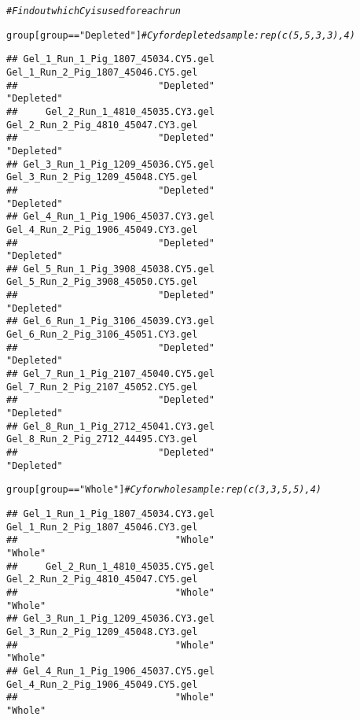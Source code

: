 \documentclass{article}\usepackage[]{graphicx}\usepackage[]{color}
\makeatletter
\newcommand{\hlstr}[1]{\textcolor[rgb]{0.192,0.494,0.8}{#1}}%
\newcommand{\hlcom}[1]{\textcolor[rgb]{0.678,0.584,0.686}{\textit{#1}}}%
\newcommand{\hlopt}[1]{\textcolor[rgb]{0,0,0}{#1}}%
\newcommand{\hlstd}[1]{\textcolor[rgb]{0.345,0.345,0.345}{#1}}%
\newenvironment{kframe}{%
 \def\at@end@of@kframe{}%
 \ifinner\ifhmode%
  \def\at@end@of@kframe{\end{minipage}}%
  \begin{minipage}{\columnwidth}%
 \fi\fi%
 \def\FrameCommand##1{\hskip\@totalleftmargin \hskip-\fboxsep
 \colorbox{shadecolor}{##1}\hskip-\fboxsep
     \hskip-\linewidth \hskip-\@totalleftmargin \hskip\columnwidth}%
 \MakeFramed {\advance\hsize-\width
   \@totalleftmargin\z@ \linewidth\hsize
   \@setminipage}}%
 {\par\unskip\endMakeFramed%
 \at@end@of@kframe}
\newenvironment{knitrout}{}{} %
\makeatother
\begin{document}
\begin{knitrout}
\color{fgcolor}\begin{kframe}
\begin{alltt}
\hlcom{# Find out which Cy is used for each run}

\hlstd{group[group} \hlopt{==} \hlstr{"Depleted"}\hlstd{]}  \hlcom{# Cy for depleted sample : rep(c(5,5,3,3),4)}
\end{alltt}
\begin{verbatim}
## Gel_1_Run_1_Pig_1807_45034.CY5.gel Gel_1_Run_2_Pig_1807_45046.CY5.gel 
##                         "Depleted"                         "Depleted" 
##     Gel_2_Run_1_4810_45035.CY3.gel Gel_2_Run_2_Pig_4810_45047.CY3.gel 
##                         "Depleted"                         "Depleted" 
## Gel_3_Run_1_Pig_1209_45036.CY5.gel Gel_3_Run_2_Pig_1209_45048.CY5.gel 
##                         "Depleted"                         "Depleted" 
## Gel_4_Run_1_Pig_1906_45037.CY3.gel Gel_4_Run_2_Pig_1906_45049.CY3.gel 
##                         "Depleted"                         "Depleted" 
## Gel_5_Run_1_Pig_3908_45038.CY5.gel Gel_5_Run_2_Pig_3908_45050.CY5.gel 
##                         "Depleted"                         "Depleted" 
## Gel_6_Run_1_Pig_3106_45039.CY3.gel Gel_6_Run_2_Pig_3106_45051.CY3.gel 
##                         "Depleted"                         "Depleted" 
## Gel_7_Run_1_Pig_2107_45040.CY5.gel Gel_7_Run_2_Pig_2107_45052.CY5.gel 
##                         "Depleted"                         "Depleted" 
## Gel_8_Run_1_Pig_2712_45041.CY3.gel Gel_8_Run_2_Pig_2712_44495.CY3.gel 
##                         "Depleted"                         "Depleted"
\end{verbatim}
\begin{alltt}
\hlstd{group[group} \hlopt{==} \hlstr{"Whole"}\hlstd{]}  \hlcom{# Cy for whole sample : rep(c(3,3,5,5),4)}
\end{alltt}
\begin{verbatim}
## Gel_1_Run_1_Pig_1807_45034.CY3.gel Gel_1_Run_2_Pig_1807_45046.CY3.gel 
##                            "Whole"                            "Whole" 
##     Gel_2_Run_1_4810_45035.CY5.gel Gel_2_Run_2_Pig_4810_45047.CY5.gel 
##                            "Whole"                            "Whole" 
## Gel_3_Run_1_Pig_1209_45036.CY3.gel Gel_3_Run_2_Pig_1209_45048.CY3.gel 
##                            "Whole"                            "Whole" 
## Gel_4_Run_1_Pig_1906_45037.CY5.gel Gel_4_Run_2_Pig_1906_45049.CY5.gel 
##                            "Whole"                            "Whole" 

\end{verbatim}
\end{kframe}
\end{knitrout}
\end{document}
